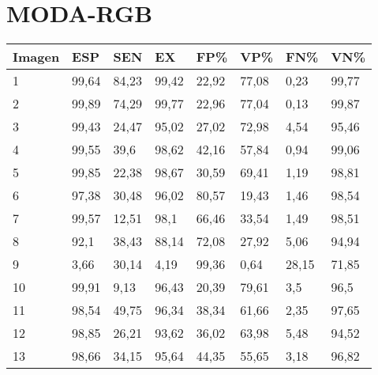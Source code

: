 \section{MODA-RGB}
\begin{longtable}[c]{|l|l|l|l|l|l|l|l|}
\hline
\textbf{Imagen} & \textbf{ESP} & \textbf{SEN} & \textbf{EX} & \textbf{FP\%} & \textbf{VP\%} & \textbf{FN\%} & \textbf{VN\%} \\ \hline
\endfirsthead
%
\endhead
%
1               & 99,64        & 84,23        & 99,42       & 22,92         & 77,08         & 0,23          & 99,77         \\ \hline
2               & 99,89        & 74,29        & 99,77       & 22,96         & 77,04         & 0,13          & 99,87         \\ \hline
3               & 99,43        & 24,47        & 95,02       & 27,02         & 72,98         & 4,54          & 95,46         \\ \hline
4               & 99,55        & 39,6         & 98,62       & 42,16         & 57,84         & 0,94          & 99,06         \\ \hline
5               & 99,85        & 22,38        & 98,67       & 30,59         & 69,41         & 1,19          & 98,81         \\ \hline
6               & 97,38        & 30,48        & 96,02       & 80,57         & 19,43         & 1,46          & 98,54         \\ \hline
7               & 99,57        & 12,51        & 98,1        & 66,46         & 33,54         & 1,49          & 98,51         \\ \hline
8               & 92,1         & 38,43        & 88,14       & 72,08         & 27,92         & 5,06          & 94,94         \\ \hline
9               & 3,66         & 30,14        & 4,19        & 99,36         & 0,64          & 28,15         & 71,85         \\ \hline
10              & 99,91        & 9,13         & 96,43       & 20,39         & 79,61         & 3,5           & 96,5          \\ \hline
11              & 98,54        & 49,75        & 96,34       & 38,34         & 61,66         & 2,35          & 97,65         \\ \hline
12              & 98,85        & 26,21        & 93,62       & 36,02         & 63,98         & 5,48          & 94,52         \\ \hline
13              & 98,66        & 34,15        & 95,64       & 44,35         & 55,65         & 3,18          & 96,82         \\ \hline

\end{longtable}
